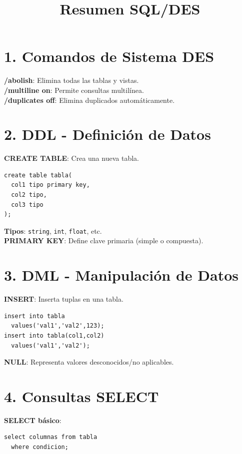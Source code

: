 \documentclass[10pt,a4paper,twocolumn]{article}
\title{\textbf{Resumen SQL/DES}}
\author{}
\date{}
\begin{document}
\small

\maketitle

\section*{1. Comandos de Sistema DES}

\textbf{/abolish}: Elimina todas las tablas y vistas.\\
\textbf{/multiline on}: Permite consultas multilínea.\\
\textbf{/duplicates off}: Elimina duplicados automáticamente.

\section*{2. DDL - Definición de Datos}

\textbf{CREATE TABLE}: Crea una nueva tabla.
\begin{lstlisting}
create table tabla(
  col1 tipo primary key,
  col2 tipo,
  col3 tipo
);
\end{lstlisting}

\textbf{Tipos}: \texttt{string}, \texttt{int}, \texttt{float}, etc.\\
\textbf{PRIMARY KEY}: Define clave primaria (simple o compuesta).

\section*{3. DML - Manipulación de Datos}

\textbf{INSERT}: Inserta tuplas en una tabla.
\begin{lstlisting}
insert into tabla 
  values('val1','val2',123);
insert into tabla(col1,col2) 
  values('val1','val2');
\end{lstlisting}

\textbf{NULL}: Representa valores desconocidos/no aplicables.

\section*{4. Consultas SELECT}

\textbf{SELECT básico}:
\begin{lstlisting}
select columnas from tabla
  where condicion;
\end{lstlisting}
\end{document}

